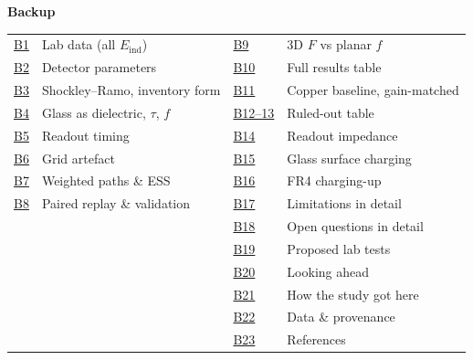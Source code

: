 \documentclass[aspectratio=169,11pt]{beamer}
\newif\ifbackup
\newcommand{\Eind}{E_\text{ind}}
\begin{document}
\appendix
\backuptrue
\begin{frame}
  \centering\vfill{\Huge\bfseries Backup}\vfill
  \small
  \begin{tabular}{@{}ll@{\hspace{2em}}ll@{}}
    \hyperlink{b-data}{B1} & Lab data (all $\Eind$) & \hyperlink{b-planar}{B9} & 3D $F$ vs planar $f$\\
    \hyperlink{b-det}{B2} & Detector parameters & \hyperlink{b-table}{B10} & Full results table\\
    \hyperlink{b-sr}{B3} & Shockley--Ramo, inventory form & \hyperlink{b-gainmatched}{B11} & Copper baseline, gain-matched\\
    \hyperlink{b-tau}{B4} & Glass as dielectric, $\tau$, $f$ & \hyperlink{b-ruled1}{B12--13} & Ruled-out table\\
    \hyperlink{b-csa}{B5} & Readout timing & \hyperlink{b-imp}{B14} & Readout impedance\\
    \hyperlink{b-grid}{B6} & Grid artefact & \hyperlink{b-surf}{B15} & Glass surface charging\\
    \hyperlink{b-ess}{B7} & Weighted paths \& ESS & \hyperlink{b-fr4}{B16} & FR4 charging-up\\
    \hyperlink{b-replay}{B8} & Paired replay \& validation & \hyperlink{b-limits}{B17} & Limitations in detail\\
     & & \hyperlink{b-open}{B18} & Open questions in detail\\
     & & \hyperlink{b-tests}{B19} & Proposed lab tests\\
     & & \hyperlink{b-ahead}{B20} & Looking ahead\\
     & & \hyperlink{b-history}{B21} & How the study got here\\
     & & \hyperlink{b-prov}{B22} & Data \& provenance\\
     & & \hyperlink{b-refs}{B23} & References\\
  \end{tabular}
  \vfill
\end{frame}
\end{document}
